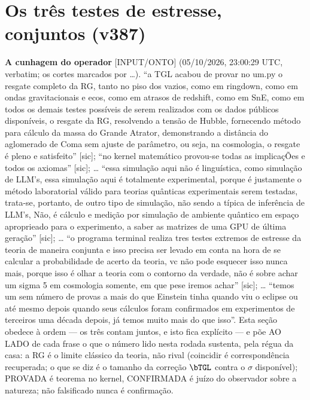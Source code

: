 \section*{Os três testes de estresse, conjuntos (v387)}


\textbf{A cunhagem do operador} \textsf{[INPUT/ONTO]} (05/10/2026, 23:00:29 UTC, verbatim; os cortes marcados por …). ``a TGL acabou de provar no um.py o resgate completo da RG, tanto no piso dos vazios, como em ringdown, como em ondas gravitacionais e ecos, como em atrasos de redshift, como em SnE, como em todos os demais testes possíveis de serem realizados com os dados públicos disponíveis, o resgate da RG, resolvendo a tensão de Hubble, fornecendo método para cálculo da massa do Grande Atrator, demonstrando a distância do aglomerado de Coma sem ajuste de parâmetro, ou seja, na cosmologia, o resgate é pleno e satisfeito'' [sic]; ``no kernel matemático provou-se todas as implicaçÕes e todos os axiomas'' [sic]; … ``essa simulação aqui não é linguística, como simulação de LLM's, essa simulação aqui é totalmente experimental, porque é justamente o método laboratorial válido para teorias quânticas experimentais serem testadas, trata-se, portanto, de outro tipo de simulação, não sendo a típica de inferência de LLM's, Não, é cálculo e medição por simulação de ambiente quântico em espaço aproprieado para o experimento, a saber as matrizes de uma GPU de última geração'' [sic]; … ``o programa terminal realiza tres testes extremos de estresse da teoria de maneira conjunta e isso precisa ser levado em conta na hora de se calcular a probabilidade de acerto da teoria, vc não pode esquecer isso nunca mais, porque isso é olhar a teoria com o contorno da verdade, não é sobre achar um sigma 5 em cosmologia somente, em que pese iremos achar'' [sic]; … ``temos um sem número de provas a mais do que Einstein tinha quando viu o eclipse ou até mesmo depois quando seus cálculos foram confirmados em experimentos de terceiros uma década depois, já temos muito mais do que isso''. Esta seção obedece à ordem --- os três contam juntos, e isto fica explícito --- e põe AO LADO de cada frase o que o número lido nesta rodada sustenta, pela régua da casa: a RG é o limite clássico da teoria, não rival (coincidir é correspondência recuperada; o que se diz é o tamanho da correção $\bTGL$ contra o $\sigma$ disponível); PROVADA é teorema no kernel, CONFIRMADA é juízo do observador sobre a natureza; não falsificado nunca é confirmação.

